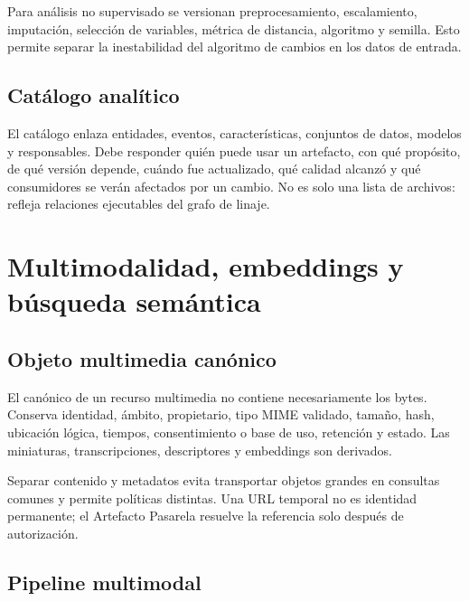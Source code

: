 Para análisis no supervisado se versionan preprocesamiento, escalamiento, imputación,
selección de variables, métrica de distancia, algoritmo y semilla. Esto permite separar
la inestabilidad del algoritmo de cambios en los datos de entrada.

\section{Catálogo analítico}
\enlargethispage{3\baselineskip}

El catálogo enlaza entidades, eventos, características, conjuntos de datos, modelos y responsables.
Debe responder quién puede usar un artefacto, con qué propósito, de qué versión depende,
cuándo fue actualizado, qué calidad alcanzó y qué consumidores se verán afectados por
un cambio. No es solo una lista de archivos: refleja relaciones ejecutables del grafo de
linaje.

\chapter{Multimodalidad, embeddings y búsqueda semántica}

\section{Objeto multimedia canónico}

El canónico de un recurso multimedia no contiene necesariamente los bytes. Conserva
identidad, ámbito, propietario, tipo MIME validado, tamaño, hash, ubicación lógica,
tiempos, consentimiento o base de uso, retención y estado. Las miniaturas,
transcripciones, descriptores y embeddings son derivados.

Separar contenido y metadatos evita transportar objetos grandes en consultas comunes y
permite políticas distintas. Una URL temporal no es identidad permanente; el Artefacto
Pasarela resuelve la referencia solo después de autorización.

\section{Pipeline multimodal}

